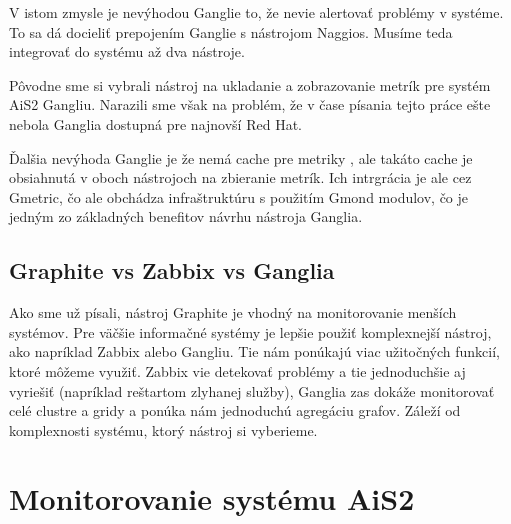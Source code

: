 \documentclass[a4paper, upjsfrontpage, disablespecwarning, thesismargins, thesislinespacing]{rnthesis}
\begin{document}
V istom zmysle je nevýhodou Ganglie to, že nevie alertovať problémy v systéme.
To sa dá docieliť prepojením Ganglie s nástrojom Naggios.
Musíme teda integrovať do systému až dva nástroje.

Pôvodne sme si vybrali nástroj na ukladanie a zobrazovanie metrík pre systém AiS2 Gangliu.
Narazili sme však na problém, že v čase písania tejto práce ešte nebola Ganglia dostupná pre najnovší Red Hat.

Ďalšia nevýhoda Ganglie je že nemá cache pre metriky \cite{6}, ale takáto cache je obsiahnutá v oboch nástrojoch na zbieranie metrík. Ich intrgrácia je ale cez Gmetric, čo ale obchádza infraštruktúru s použitím Gmond modulov, čo je jedným zo základných benefitov návrhu nástroja Ganglia.



\section{Graphite vs Zabbix vs Ganglia}

Ako sme už písali, nástroj Graphite je vhodný na monitorovanie menších systémov.
Pre väčšie informačné systémy je lepšie použiť komplexnejší nástroj, ako napríklad Zabbix alebo Gangliu.
Tie nám ponúkajú viac užitočných funkcií, ktoré môžeme využiť.
Zabbix vie detekovať problémy a tie jednoduchšie aj vyriešiť (napríklad reštartom zlyhanej služby), 
	Ganglia zas dokáže monitorovať celé clustre a gridy a ponúka nám jednoduchú agregáciu grafov.
Záleží od komplexnosti systému, ktorý nástroj si vyberieme.


\chapter{Monitorovanie systému AiS2}

\end{document}
